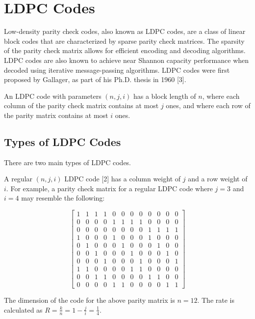 \documentclass[conference]{IEEEtran}
\begin{document}
\section{LDPC Codes}
Low-density parity check codes, also known as LDPC codes, are a class of linear block
codes that are characterized by sparse parity check matrices. The sparsity of
the parity check matrix allows for efficient encoding and decoding algorithms.
LDPC codes are also known to achieve near Shannon capacity performance when
decoded using iterative message-passing algorithms.
LDPC codes were first proposed by Gallager, as part of his Ph.D. thesis in 1960 [3].

An LDPC code with parameters $(n,j,i)$ has a block length of $n$, where each column of the parity check matrix contains at most $j$ ones, and where each row of the parity matrix contains at most $i$ ones.

\subsection{Types of LDPC Codes}
There are two main types of LDPC codes.

A regular $(n,j,i)$ LDPC code [2] has a column weight of $j$ and a row weight of $i$.
For example, a parity check matrix for a regular LDPC code where $j=3$ and $i=4$ may resemble the following:

$$\begin{bmatrix}
    1 & 1 & 1 & 1 & 0 & 0 & 0 & 0 & 0 & 0 & 0 & 0 \\
    0 & 0 & 0 & 0 & 1 & 1 & 1 & 1 & 0 & 0 & 0 & 0 \\
    0 & 0 & 0 & 0 & 0 & 0 & 0 & 0 & 1 & 1 & 1 & 1 \\
    1 & 0 & 0 & 0 & 1 & 0 & 0 & 0 & 1 & 0 & 0 & 0 \\
    0 & 1 & 0 & 0 & 0 & 1 & 0 & 0 & 0 & 1 & 0 & 0 \\
    0 & 0 & 1 & 0 & 0 & 0 & 1 & 0 & 0 & 0 & 1 & 0 \\
    0 & 0 & 0 & 1 & 0 & 0 & 0 & 1 & 0 & 0 & 0 & 1 \\
    1 & 1 & 0 & 0 & 0 & 0 & 1 & 1 & 0 & 0 & 0 & 0 \\
    0 & 0 & 1 & 1 & 0 & 0 & 0 & 0 & 1 & 1 & 0 & 0 \\
    0 & 0 & 0 & 0 & 1 & 1 & 0 & 0 & 0 & 0 & 1 & 1
  \end{bmatrix}$$

The dimension of the code for the above parity matrix is $n=12$.
The rate is calculated as $R=\frac{k}{n}=1-\frac{j}{i}=\frac{1}{4}$.
\end{document}
